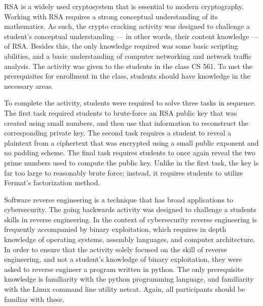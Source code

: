     RSA is a widely used cryptosystem that is essential to modern cryptography. 
    Working with RSA requires a strong conceptual understanding of its mathematics. 
    As such, the crypto cracking activity was designed to challenge a student's conceptual understanding --- 
    in other words, their content knowledge --- 
    of RSA. 
    Besides this, the only knowledge required was some basic scripting abilities, and a basic understanding of computer networking and network traffic analysis. 
    The activity was given to the students in the class CS 561. 
    To met the prerequisites for enrollment in the class, students should have knowledge in the necessary areas. 


    To complete the activity, students were required to solve three tasks in sequence. 
    The first task required students to brute-force an RSA public key that was created using small numbers, and then use that information to reconstruct the corresponding private key. 
    The second task requires a student to reveal a plaintext from a ciphertext that was encrypted using a small public exponent and no padding scheme. 
    The final task requires students to once again reveal the two prime numbers used to compute the public key. 
    Unlike in the first task, the key is far too large to reasonably brute force; 
    instead, it requires students to utilize Fermat's factorization method. 

    Software reverse engineering is a technique that has broad applications to cybersecurity. 
    The going backwards activity was designed to challenge a students skills in reverse engineering. 
    In the context of cybersecurity reverse engineering is frequently accompanied by binary exploitation, which requires in depth knowledge of operating systems, assembly languages, and computer architecture. 
    In order to ensure that the activity solely focused on the skill of reverse engineering, and not a student's knowledge of binary exploitation, they were asked to reverse engineer a program written in python. 
    The only prerequisite knowledge is familiarity with the python programming language, and familiarity with the Linux command line utility netcat. 
    Again, all participants should be familiar with these.

